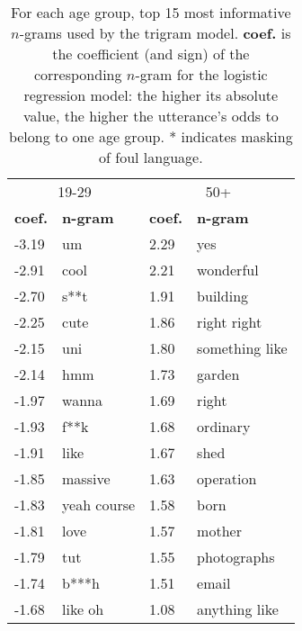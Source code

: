 \begin{table}[b!]
    \centering
    \begin{tabular}{@{}l l @{\hspace*{25pt}} l l@{}}
    \toprule
    \multicolumn{2}{c}{19-29} & \multicolumn{2}{c}{50+}\\
    \textbf{coef.} & \textbf{n-gram} & \textbf{coef.} & \textbf{n-gram}\\
    \midrule
    -3.19 & um & 2.29 & yes\\
    -2.91 & cool & 2.21 & wonderful\\
    -2.70 & s**t & 1.91 & building\\
    -2.25 & cute & 1.86 & right right\\
    -2.15 & uni & 1.80 & something like\\
    -2.14 & hmm & 1.73 & garden\\
    -1.97 & wanna & 1.69 & right\\
    -1.93 & f**k & 1.68 & ordinary\\
    -1.91 & like & 1.67 & shed\\
    -1.85 & massive & 1.63 & operation\\
    -1.83 & yeah course & 1.58 & born\\
    -1.81 & love & 1.57 & mother\\
    -1.79 & tut & 1.55 & photographs\\
    -1.74 & b***h & 1.51 & email\\
    -1.68 & like oh & 1.08 & anything like\\
    \bottomrule
    \end{tabular}
    \caption{ For each age group, top 15 most informative $n$-grams used by the trigram model. \textbf{coef.} is the coefficient (and sign) of the corresponding $n$-gram for the logistic regression model: the higher its absolute value, the higher the utterance's odds to belong to one age group.
    * indicates masking of foul language.}
    \label{tab:top_ngrams}
\end{table}

